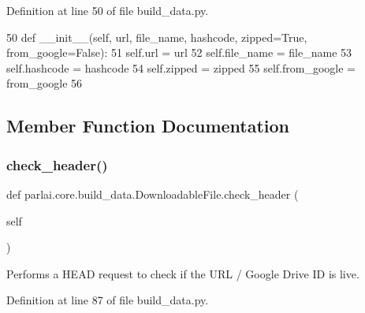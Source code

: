 Definition at line 50 of file build\+\_\+data.\+py.


\begin{DoxyCode}
50     \textcolor{keyword}{def }\_\_init\_\_(self, url, file\_name, hashcode, zipped=True, from\_google=False):
51         self.url = url
52         self.file\_name = file\_name
53         self.hashcode = hashcode
54         self.zipped = zipped
55         self.from\_google = from\_google
56 
\end{DoxyCode}


\subsection{Member Function Documentation}
\mbox{\label{classparlai_1_1core_1_1build__data_1_1DownloadableFile_ad08cadfb6f34f251368bf16fab6e557d}} 
\subsubsection{\texorpdfstring{check\+\_\+header()}{check\_header()}}
{\footnotesize\ttfamily def parlai.\+core.\+build\+\_\+data.\+Downloadable\+File.\+check\+\_\+header (\begin{DoxyParamCaption}\item[{}]{self }\end{DoxyParamCaption})}

\begin{DoxyVerb}Performs a HEAD request to check if the URL / Google Drive ID is live.
\end{DoxyVerb}
 

Definition at line 87 of file build\+\_\+data.\+py.


